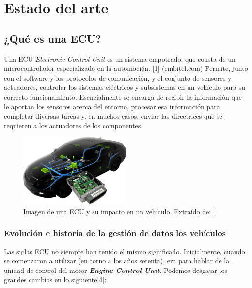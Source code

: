 \chapter{Estado del arte}


\section{¿Qué es una ECU?}


Una ECU \textit{Electronic Control Unit} es un sistema empotrado, que consta de un microcontrolador especializado en la automoción. [1] (embitel.com) Permite, junto con el software y los protocolos de comunicación, y el conjunto de sensores y actuadores, controlar los sistemas eléctricos y subsistemas en un vehículo para su correcto funcionamiento. 
Esencialmente se encarga de recibir la información que le aportan los sensores acerca del entorno, procesar esa información para completar diversas tareas y, en muchos casos, enviar las directrices que se requieren a los actuadores de los componentes.\newline


\begin{figure}[h]
    \centering
    \includegraphics[width=0.5\textwidth]{imagenes/ECU_autotechdrive.png}
    \caption{Imagen de una ECU y su impacto en un vehículo. Extraído de: []}
\end{figure}


\subsection{Evolución e historia de la gestión de datos los vehículos}

Las siglas ECU no siempre han tenido el mismo significado. Inicialmente, cuando se comenzaron a utilizar (en torno a los años setenta), era para hablar de la unidad de control del motor \textit{\textbf{Engine Control Unit}}. Podemos desgajar los grandes cambios en lo siguiente[4]:

